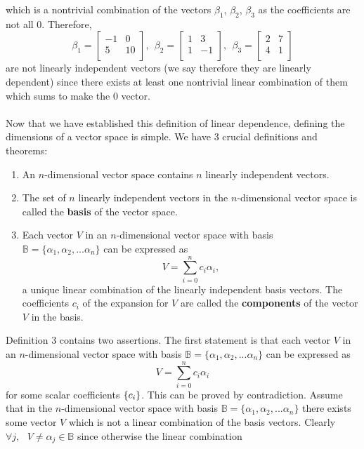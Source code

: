 which is a nontrivial combination of the vectors $\beta_{1}$, $\beta_{2}$, $\beta_{3}$ as the coefficients are not all 0. Therefore,
$$
\beta_{1} = \begin{bmatrix}
    -1 & 0 \\
    5 & 10 \\
    \end{bmatrix}, \:\:
\beta_{2} = \begin{bmatrix}
    1 & 3 \\
    1 & -1 \\
    \end{bmatrix}, \:\:
\beta_{3} = \begin{bmatrix}
    2 & 7 \\
    4 & 1 \\
    \end{bmatrix}
$$
are not linearly independent vectors (we say therefore they are linearly dependent) since there exists at least one nontrivial linear combination of them which sums to make the $0$ vector.
\\\\
Now that we have established this definition of linear dependence, defining the dimensions of a vector space is simple. We have 3 crucial definitions and theorems:
\begin{enumerate}
    \item An $n$-dimensional vector space contains $n$ linearly independent vectors.
    \item The set of $n$ linearly independent vectors in the $n$-dimensional vector space is called the \textbf{basis} of the vector space.
    \item Each vector $V$ in an $n$-dimensional vector space with basis \\ $\mathbb{B}= \{\alpha_1, \alpha_2, ...\alpha_n\}$ can be expressed as 
    $$
    V=\sum_{i=0}^{n}c_{i}\alpha_{i},
    $$
    a unique linear combination of the linearly independent basis vectors. The coefficients $c_{i}$ of the expansion for $V$ are called the \textbf{components} of the vector $V$ in the basis.
\end{enumerate}
Definition $3$ contains two assertions. The first statement is that each vector $V$ in an $n$-dimensional vector space with basis $\mathbb{B}= \{\alpha_1, \alpha_2, ...\alpha_n\}$ can be expressed as 
$$
V=\sum_{i=0}^{n}c_{i}\alpha_{i}
$$ for some scalar coefficients $\{c_{i}\}$. This can be proved by contradiction. Assume that in the $n$-dimensional vector space with basis $\mathbb{B}= \{\alpha_1, \alpha_2, ...\alpha_n\}$ there exists some vector $V$ which is not a linear combination of the basis vectors. Clearly $\forall j, \:\:\: V \neq \alpha_{j} \in \mathbb{B}$ since otherwise the linear combination 
